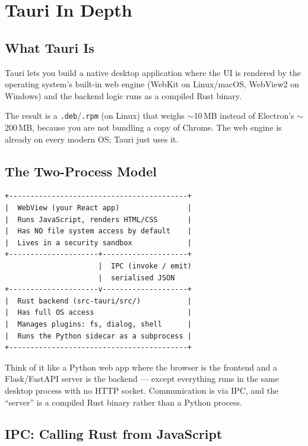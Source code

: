\documentclass[11pt,a4paper]{article}
\begin{document}
\section{Tauri In Depth}
\label{sec:tauri}

\subsection{What Tauri Is}

Tauri lets you build a native desktop application where the UI is rendered by the
operating system's built-in web engine (WebKit on Linux/macOS, WebView2 on Windows)
and the backend logic runs as a compiled Rust binary.

The result is a \texttt{.deb}/\texttt{.rpm} (on Linux) that weighs $\sim$10\,MB instead
of Electron's $\sim$200\,MB, because you are not bundling a copy of Chrome. The web
engine is already on every modern OS; Tauri just uses it.

\subsection{The Two-Process Model}

\begin{lstlisting}[language={}]
+------------------------------------------+
|  WebView (your React app)                |
|  Runs JavaScript, renders HTML/CSS       |
|  Has NO file system access by default    |
|  Lives in a security sandbox             |
+---------------------+--------------------+
                      |  IPC (invoke / emit)
                      |  serialised JSON
+---------------------v--------------------+
|  Rust backend (src-tauri/src/)           |
|  Has full OS access                      |
|  Manages plugins: fs, dialog, shell      |
|  Runs the Python sidecar as a subprocess |
+------------------------------------------+
\end{lstlisting}

Think of it like a Python web app where the browser is the frontend and a
Flask/FastAPI server is the backend --- except everything runs in the same desktop
process with no HTTP socket. Communication is via IPC, and the ``server'' is a
compiled Rust binary rather than a Python process.

\subsection{IPC: Calling Rust from JavaScript}
\end{document}
